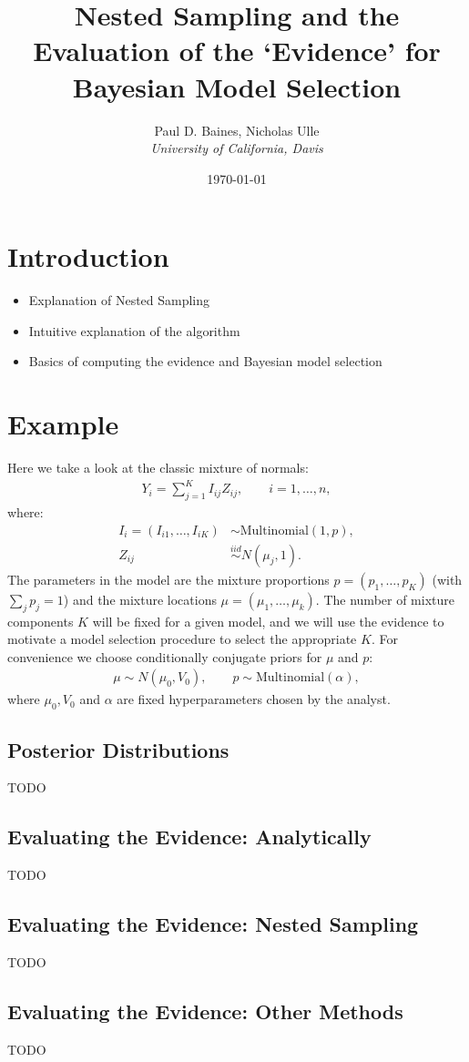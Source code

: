 \documentclass[11pt]{article}
\newcommand{\iid}{\stackrel{iid}{\sim}}
\begin{document}
\title{Nested Sampling and the Evaluation of the \lq{}Evidence\rq{} for Bayesian Model Selection}
\author{
Paul D. Baines, Nicholas Ulle\\
\emph{University of California, Davis}
}
\date{\today}
\maketitle

\section{Introduction}\label{overview}

\begin{itemize}
 \item Explanation of Nested Sampling
 \item Intuitive explanation of the algorithm
 \item Basics of computing the evidence and Bayesian model selection
\end{itemize}


\section{Example}
Here we take a look at the classic mixture of normals:
\begin{align*}
 Y_{i} = \sum_{j=1}^{K}I_{ij}Z_{ij} , \qquad i=1,\ldots,n , 
\end{align*}
where:
\begin{align*}
 I_{i} = (I_{i1},\ldots,I_{iK}) &\sim \textrm{Multinomial}\left(1,p\right) , \\ 
 Z_{ij} &\iid N\left(\mu_{j},1\right) .
\end{align*}
The parameters in the model are the mixture proportions $p=(p_{1},\ldots,p_{K})$ (with $\sum_{j}p_{j}=1$) and the mixture locations $\mu=(\mu_{1},\ldots,\mu_{k})$. The number of mixture components $K$ will be fixed for a given model, and we will use the evidence to motivate a model selection procedure to select the appropriate $K$. For convenience we choose conditionally conjugate priors for $\mu$ and $p$:
\begin{align*}
 \mu \sim N\left(\mu_{0},V_{0}\right) , \qquad p \sim \textrm{Multinomial}\left(\alpha\right) ,
\end{align*}
where $\mu_{0}, V_{0}$ and $\alpha$ are fixed hyperparameters chosen by the analyst.

\subsection{Posterior Distributions}

TODO

\subsection{Evaluating the Evidence: Analytically}

TODO

\subsection{Evaluating the Evidence: Nested Sampling}

TODO

\subsection{Evaluating the Evidence: Other Methods}

TODO
\end{document}
